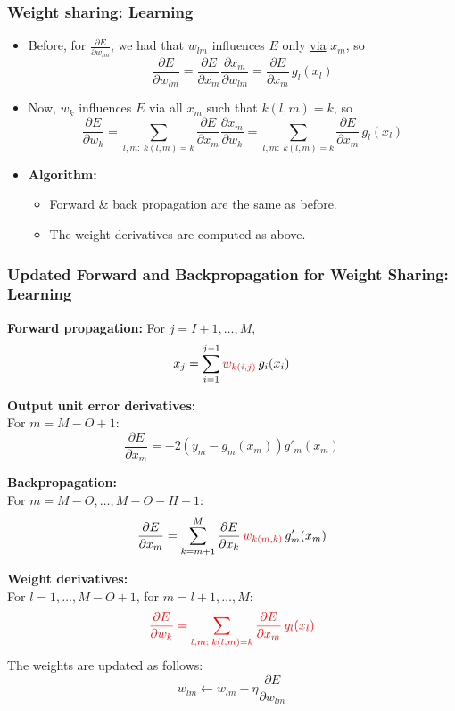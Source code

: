 \subsubsection{Weight sharing: Learning}
\begin{summary}
    \begin{itemize}
        \item Before, for \( \frac{\partial E}{\partial w_{lm}} \), we had that \( w_{lm} \) influences \( E \) only \underline{via} \( x_m \), so
        \[
        \frac{\partial E}{\partial w_{lm}} = \frac{\partial E}{\partial x_m} \frac{\partial x_m}{\partial w_{lm}} = \frac{\partial E}{\partial x_m} \, g_l(x_l)
        \]
    
        \item Now, \( w_k \) influences \( E \) via all \( x_m \) such that \( k(l, m) = k \), so
        \[
        \frac{\partial E}{\partial w_k} = \sum_{l, m: \; k(l, m) = k} \frac{\partial E}{\partial x_m} \frac{\partial x_m}{\partial w_k} = \sum_{l, m: \; k(l, m) = k} \frac{\partial E}{\partial x_m} \, g_l(x_l)
        \]
    
        \item \textbf{Algorithm:}
        \begin{itemize}
            \item Forward \& back propagation are the same as before.
            \item The weight derivatives are computed as above.
        \end{itemize}
    \end{itemize}
\end{summary}

\subsubsection{Updated Forward and Backpropagation for Weight Sharing: Learning}
\begin{summary}
    \textbf{Forward propagation:} For \( j = I+1, \ldots, M \), 
    \[
    x_j = \sum_{i=1}^{j-1} \textcolor{red}{w_{k(i,j)}} \, g_i(x_i)
    \]

    \textbf{Output unit error derivatives:} \\
    For \( m = M-O+1 \):
    \[
    \frac{\partial E}{\partial x_m} = -2(y_m - g_m(x_m)) g'_m(x_m)
    \]

    \textbf{Backpropagation:} \\
    For \( m = M-O, \ldots, M-O-H+1 \):
    \[
    \frac{\partial E}{\partial x_m} = \sum_{k=m+1}^{M} \frac{\partial E}{\partial x_k} \, \textcolor{red}{w_{k(m,k)}} \, g'_m(x_m)
    \]

    \textbf{Weight derivatives:} \\
    For \( l = 1, \ldots, M-O+1 \), for \( m = l+1, \ldots, M \):
    \[
    \textcolor{red}{\frac{\partial E}{\partial w_k} = \sum_{l,m: \; k(l,m)=k} \frac{\partial E}{\partial x_m} \, g_l(x_l)}
    \]
    The weights are updated as follows:
    \[
    w_{lm} \leftarrow w_{lm} - \eta \frac{\partial E}{\partial w_{lm}}
    \]
\end{summary}

